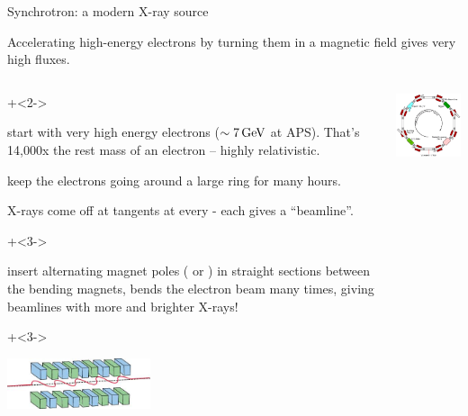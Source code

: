 \begin{slide}{Synchrotron: a modern X-ray source}

  Accelerating high-energy electrons by turning them in a magnetic field
  gives very high fluxes.

    \begin{columns}
      \begin{column}{70mm}

        {\onslide+<2-> {
            \begin{enumerate}

           \item start with very high energy
             electrons  ($\sim 7\rm\, GeV$ at APS).  That's 14,000x the
             rest mass of an electron -- highly relativistic.
             
           \item keep the electrons going around
             a large ring for many hours.
             
           \item X-rays come off at tangents at every
             {} - each gives a ``beamline''.

             {\onslide+<3-> {
               \item insert alternating magnet poles ({} or
             {}) in straight sections between the
             bending magnets, bends the electron beam many times, giving
             beamlines with more and brighter X-rays!
             }}
           \end{enumerate}
         }}
           \vmm
           {\onslide+<3-> {           
           \hspace{9mm}
           \includegraphics[width=42mm]{figs/Images/insertiondevice}

           \vspace{3mm}
           
           \vfill
           
           }}
         \end{column}
         \begin{column}{60mm}
           \vmm
           
           \includegraphics[width=50mm]{figs/Images/synchrotron_ring}


\end{column}
\end{columns}
\end{slide}
